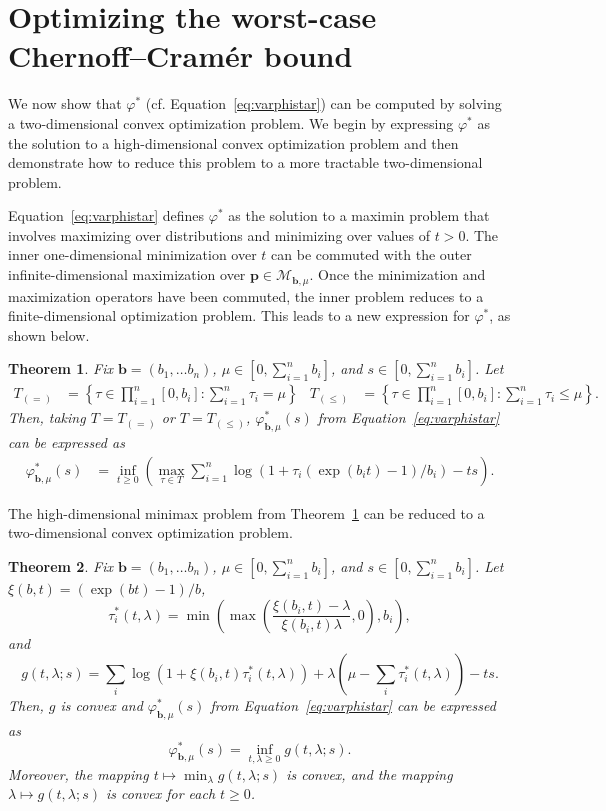 \documentclass[12pt]{article}
\theoremstyle{plain}
\newtheorem{theorem}{Theorem}[section]
\begin{document}
\section{Optimizing the worst-case Chernoff--Cram\'er bound}

We now show that $\varphi^*$ (cf. Equation~\ref{eq:varphistar}) can be computed by solving a two-dimensional convex optimization problem.  We begin by expressing $\varphi^*$ as the solution to a high-dimensional convex optimization problem and then demonstrate how to reduce this problem to a more tractable two-dimensional problem.

Equation~\ref{eq:varphistar} defines $\varphi^*$ as the solution to a maximin problem that involves maximizing over distributions and minimizing over values of $t>0$.  The inner one-dimensional minimization over $t$ can be commuted with the outer infinite-dimensional maximization over $\boldsymbol{p}\in\mathcal{M}_{\boldsymbol{b},\mu}$.  Once the minimization and maximization operators have been commuted, the inner problem reduces to a finite-dimensional optimization problem.  This leads to a new expression for $\varphi^*$, as shown below.

\begin{theorem} \label{thm:tightchernoff} Fix $\boldsymbol{b}=(b_1,\ldots b_n)$, $\mu \in [0,\sum_{i=1}^n b_i]$, and $s \in [0,\sum_{i=1}^n b_i]$.  Let
\begin{align*}
T_{(=)}& =\left\{\tau\in \prod_{i=1}^n [0,b_i] : \sum_{i=1}^n \tau_i = \mu\right\} &
T_{(\leq)}& =\left\{\tau\in \prod_{i=1}^n [0,b_i] : \sum_{i=1}^n \tau_i \leq \mu\right\}.
\end{align*}
Then, taking $T=T_{(=)}$ or $T=T_{(\leq)}$, $\varphi^*_{\boldsymbol{b},\mu}(s)$ from Equation~\ref{eq:varphistar} can be expressed as
\begin{align*}
\varphi^*_{\boldsymbol{b},\mu}(s)
&= \inf_{t\geq 0} \left(\max_{\tau \in T} \sum_{i=1}^n \log\left(1+\tau_i (\exp(b_i t)-1)/b_i \right) - ts\right).
\end{align*}
\end{theorem}

The high-dimensional minimax problem from Theorem~\ref{thm:tightchernoff} can be reduced to a two-dimensional convex optimization problem.

\begin{theorem} \label{thm:lowd} Fix $\boldsymbol{b}=(b_1,\ldots b_n)$, $\mu \in [0,\sum_{i=1}^n b_i]$, and $s \in [0,\sum_{i=1}^n b_i]$.  Let $\xi(b,t) = (\exp(bt)-1)/b$,
\[
\tau^*_i(t,\lambda) = \min\left(\max\left(\frac{\xi(b_i,t)-\lambda}{\xi(b_i,t)\lambda},0\right),b_i\right),
\]
and
\[
g(t,\lambda;s) = \sum_i \log\left(1+\xi(b_i,t)\tau_i^*(t,\lambda)\right) + \lambda\left(\mu - \sum_i \tau_i^*(t,\lambda)\right)- ts.
\]
Then, $g$ is convex and $\varphi^*_{\boldsymbol{b},\mu}(s)$ from Equation~\ref{eq:varphistar} can be expressed as
\[
\varphi^*_{\boldsymbol{b},\mu}(s) = \inf_{t,\lambda \geq 0} g(t,\lambda;s).
\]
Moreover, the mapping $t \mapsto \min_\lambda g(t,\lambda;s)$ is convex, and the mapping $\lambda \mapsto g(t,\lambda;s)$ is convex for each $t \geq 0$.
\end{theorem}
\end{document}
